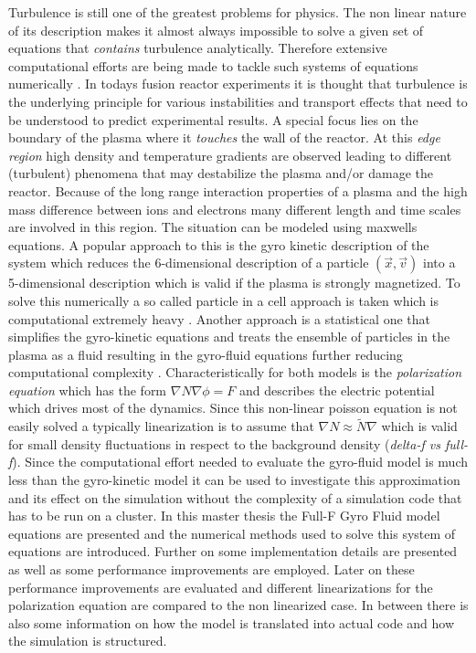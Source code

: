 \documentclass[master.tex]{subfiles}
\begin{document}
Turbulence is still one of the greatest problems for physics. The non linear nature of its description makes it almost always impossible to solve a given set of equations that \textit{contains} turbulence analytically. Therefore extensive computational efforts are being made to tackle such systems of equations numerically \cite{IntroTurbulence}.\newline
In todays fusion reactor experiments it is thought that turbulence is the underlying principle for various instabilities and transport effects that need to be understood to predict experimental results. A special focus lies on the boundary of the plasma where it \textit{touches} the wall of the reactor. At this \textit{edge region} high density and temperature gradients are observed leading to different (turbulent) phenomena that may destabilize the plasma and/or damage the reactor.\newline
Because of the long range interaction properties of a plasma and the high mass difference between ions and electrons many different length and time scales are involved in this region.\newline
The situation can be modeled using maxwells equations. A popular approach to this is the gyro kinetic description of the system which reduces the 6-dimensional description of a particle $(\vec{x},\vec{v})$ into a 5-dimensional description which is valid if the plasma is strongly magnetized. To solve this numerically a so called particle in a cell approach is taken which is computational extremely heavy \cite{GyroKineticCodes}.\newline
Another approach is a statistical one that simplifies the gyro-kinetic equations and treats the ensemble of particles in the plasma as a fluid resulting in the gyro-fluid equations further reducing computational complexity \cite{HeldDisseration}.\newline
Characteristically for both models is the \textit{polarization equation} which has the form $\nabla N \nabla \phi = F$ and describes the electric potential which drives most of the dynamics. Since this non-linear poisson equation is not easily solved a typically linearization is to assume that $\nabla N \approx \tilde{N} \nabla$ which is valid for small density fluctuations in respect to the background density (\textit{delta-f vs full-f}). Since the computational effort needed to evaluate the gyro-fluid model is much less than the gyro-kinetic model it can be used to investigate this approximation and its effect on the simulation without the complexity of a simulation code that has to be run on a cluster.\newline
In this master thesis the Full-F Gyro Fluid model equations are presented and the numerical methods used to solve this system of equations are introduced. Further on some implementation details are presented as well as some performance improvements are employed. Later on these performance improvements are evaluated and different linearizations for the polarization equation are compared to the non linearized case.\newline
{}In between there is also some information on how the model is translated into actual code and how the simulation is structured.
\end{document}

